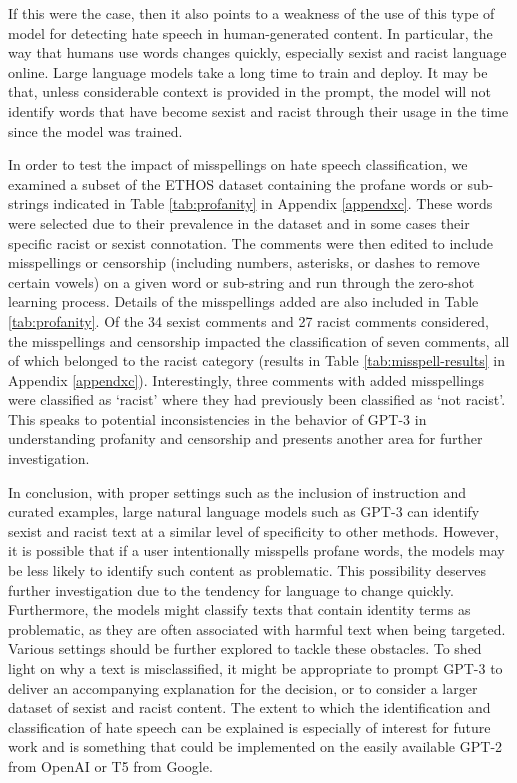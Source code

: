 \documentclass[12pt,]{article}
\begin{document}
If this were the case, then it also points to a weakness of the use of this type of model for detecting hate speech in human-generated content. In particular, the way that humans use words changes quickly, especially sexist and racist language online. Large language models take a long time to train and deploy. It may be that, unless considerable context is provided in the prompt, the model will not identify words that have become sexist and racist through their usage in the time since the model was trained.

In order to test the impact of misspellings on hate speech classification, we examined a subset of the ETHOS dataset containing the profane words or sub-strings indicated in Table \ref{tab:profanity} in Appendix \ref{appendxc}. These words were selected due to their prevalence in the dataset and in some cases their specific racist or sexist connotation. The comments were then edited to include misspellings or censorship (including numbers, asterisks, or dashes to remove certain vowels) on a given word or sub-string and run through the zero-shot learning process. Details of the misspellings added are also included in Table \ref{tab:profanity}. Of the 34 sexist comments and 27 racist comments considered, the misspellings and censorship impacted the classification of seven comments, all of which belonged to the racist category (results in Table \ref{tab:misspell-results} in Appendix \ref{appendxc}). Interestingly, three comments with added misspellings were classified as `racist' where they had previously been classified as `not racist'. This speaks to potential inconsistencies in the behavior of GPT-3 in understanding profanity and censorship and presents another area for further investigation.

In conclusion, with proper settings such as the inclusion of instruction and curated examples, large natural language models such as GPT-3 can identify sexist and racist text at a similar level of specificity to other methods. However, it is possible that if a user intentionally misspells profane words, the models may be less likely to identify such content as problematic. This possibility deserves further investigation due to the tendency for language to change quickly. Furthermore, the models might classify texts that contain identity terms as problematic, as they are often associated with harmful text when being targeted. Various settings should be further explored to tackle these obstacles. To shed light on why a text is misclassified, it might be appropriate to prompt GPT-3 to deliver an accompanying explanation for the decision, or to consider a larger dataset of sexist and racist content. The extent to which the identification and classification of hate speech can be explained is especially of interest for future work and is something that could be implemented on the easily available GPT-2 from OpenAI or T5 from Google.
\end{document}
